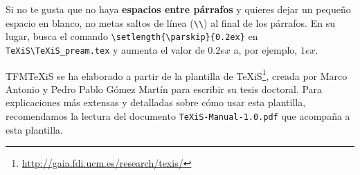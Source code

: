 Si no te gusta que no haya \textbf{espacios entre párrafos} y quieres dejar un pequeño espacio en blanco, no metas saltos de línea (\verb|\\|) al final de los párrafos. En su lugar, busca el comando  \verb|\setlength{\parskip}{0.2ex}| en \verb|TeXiS\TeXiS_pream.tex| y aumenta el valor de $0.2ex$ a, por ejemplo, $1ex$.

TFMTeXiS se ha elaborado a partir de la plantilla de TeXiS\footnote{\url{http://gaia.fdi.ucm.es/research/texis/}}, creada por Marco Antonio y Pedro Pablo Gómez Martín para escribir su tesis doctoral. Para explicaciones más extensas y detalladas sobre cómo usar esta plantilla, recomendamos la lectura del documento \texttt{TeXiS-Manual-1.0.pdf} que acompaña a esta plantilla.

